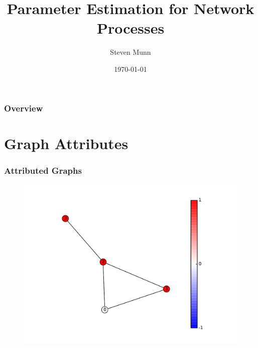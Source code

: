 \documentclass{beamer}
\title[Network Process Modeling]{Parameter Estimation for Network Processes}
\author{Steven Munn} %
\institute[UCSB]
{
University of California, Santa Barbara \\ %
\medskip
\textit{sjmunn@umail.ucsb.edu} %
}
\date{\today} %
\begin{document}
\begin{frame}
\titlepage %
\end{frame}

\begin{frame}
\frametitle{Overview} %
\tableofcontents %
\end{frame}


\section{Graph Attributes}

\begin{frame}
\frametitle{Attributed Graphs}
\begin{figure}
\includegraphics[width=0.8\linewidth]{figs/attributed_graph}
\end{figure}
\end{frame}
\end{document}
